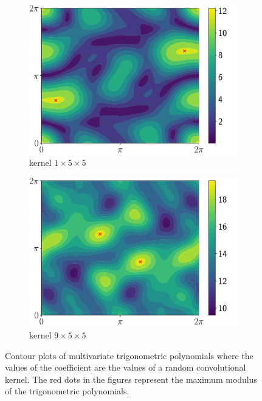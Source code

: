 \begin{figure}[htb]
\begin{subfigure}[b]{.49\textwidth}
    \includegraphics[scale=0.35]{figures/main/ch5-lipschitz_regularization/contour_poly_200_1_1_5.pdf}
    \caption{kernel $1\times5\times5$}
  \end{subfigure}
  \begin{subfigure}[b]{.49\textwidth}
    \centering
    \includegraphics[scale=0.35]{figures/main/ch5-lipschitz_regularization/contour_poly_200_1_9_5.pdf}
    \caption{kernel $9\times5\times5$}
  \end{subfigure}
  \caption{Contour plots of multivariate trigonometric polynomials where the values of the coefficient are the values of a random convolutional kernel. The red dots in the figures represent the maximum modulus of the trigonometric polynomials.}
  \label{figure:contour_plot_trigonometric_polynomials}
\end{figure}%


